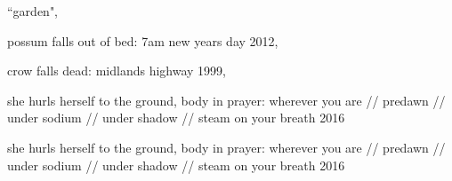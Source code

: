 \documentclass[extrafontsizes, 48pt]{memoir}
\begin{document}
	\begin{minipage}{.6\textwidth}
	``garden",
	\end{minipage}
	\newpage

	\begin{minipage}{.6\textwidth}
	possum falls out of bed: 7am new years day 2012,
	\end{minipage}
	\newpage

	\begin{minipage}{.6\textwidth}
	crow falls dead: midlands highway 1999,
	\end{minipage}
	\newpage

	\begin{minipage}{.6\textwidth}
	she hurls herself to the ground, body in prayer: wherever you are // 
	predawn // under sodium // under shadow // steam on your breath 2016
	\end{minipage}
	\newpage

	\begin{minipage}{.6\textwidth}
	she hurls herself to the ground, body in prayer: wherever you are // 
	predawn // under sodium // under shadow // steam on your breath 2016
	\end{minipage}
	\newpage
\end{document}
